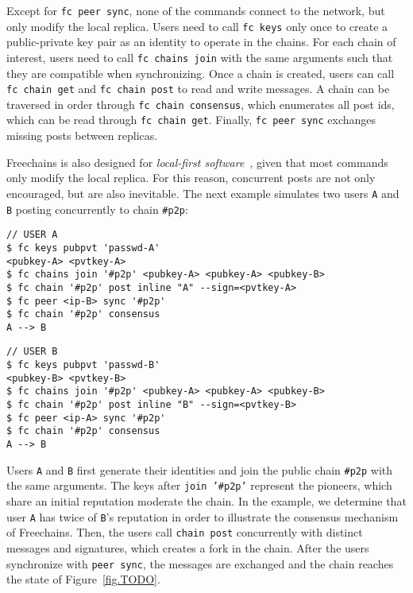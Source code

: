 \documentclass[12pt]{article}
\newcommand{\code}[1]  {\texttt{\footnotesize{#1}}}
\begin{document}
Except for \code{fc~peer~sync}, none of the commands connect to the network,
but only modify the local replica.
%
Users need to call \code{fc~keys} only once to create a public-private key pair
as an identity to operate in the chains.
%
For each chain of interest, users need to call \code{fc~chains~join} with the
same arguments such that they are compatible when synchronizing.
%
Once a chain is created, users can call \code{fc~chain~get} and
\code{fc~chain~post} to read and write messages.
%
A chain can be traversed in order through \code{fc~chain~consensus}, which
enumerates all post ids, which can be read through \code{fc~chain~get}.
%
Finally, \code{fc~peer~sync} exchanges missing posts between replicas.

Freechains is also designed for \emph{local-first software}~\cite{TODO}, given
that most commands only modify the local replica.
For this reason, concurrent posts are not only encouraged, but are also
inevitable.
The next example simulates two users \code{A} and \code{B} posting concurrently
to chain \code{#p2p}:

\noindent
{\footnotesize
\begin{minipage}[t]{0.6\textwidth}
\begin{verbatim}
// USER A
$ fc keys pubpvt 'passwd-A'
<pubkey-A> <pvtkey-A>
$ fc chains join '#p2p' <pubkey-A> <pubkey-A> <pubkey-B>
$ fc chain '#p2p' post inline "A" --sign=<pvtkey-A>
$ fc peer <ip-B> sync '#p2p'
$ fc chain '#p2p' consensus
A --> B
\end{verbatim}
\end{minipage}
\begin{minipage}[t]{0.4\textwidth}
\begin{verbatim}
// USER B
$ fc keys pubpvt 'passwd-B'
<pubkey-B> <pvtkey-B>
$ fc chains join '#p2p' <pubkey-A> <pubkey-A> <pubkey-B>
$ fc chain '#p2p' post inline "B" --sign=<pvtkey-B>
$ fc peer <ip-A> sync '#p2p'
$ fc chain '#p2p' consensus
A --> B
\end{verbatim}
\end{minipage}
}

Users \code{A} and \code{B} first generate their identities and join the
public chain \code{#p2p} with the same arguments.
The keys after \code{join '#p2p'} represent the pioneers, which share an
initial reputation moderate the chain.
In the example, we determine that user \code{A} has twice of \code{B}'s
reputation in order to illustrate the consensus mechanism of Freechains.
Then, the users call \code{chain post} concurrently with distinct messages and
signatures, which creates a fork in the chain.
After the users synchronize with \code{peer sync}, the messages are exchanged
and the chain reaches the state of Figure~\ref{fig.TODO}.
\end{document}
